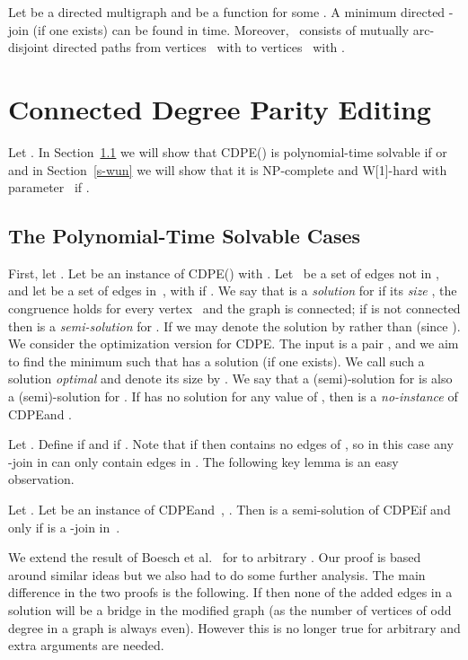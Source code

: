 \documentclass[11pt]{llncs}
\newcommand{\cdpe}{{\sc CDPE}}
\newcommand{\NP}{{\sf NP}}
\newcommand{\W}{{\sf W[1]}}
\begin{document}
\begin{lemma}\label{lem:dir-t-join}
Let  be a directed multigraph and  be  a
function for some .  A minimum directed -join  (if one
exists) can be found in  time. Moreover,~ consists
of mutually arc-disjoint directed paths from vertices~ with  to
vertices~ with .
\end{lemma}




\section{Connected Degree Parity Editing}\label{sec:undirected}

Let .  
In Section~\ref{s-polyun} we will show that
\cdpe() is polynomial-time solvable if  or  and
in Section~\ref{s-wun} we will show 
that it is \NP-complete and \W-hard with parameter~ if .

\subsection{The Polynomial-Time Solvable Cases}\label{s-polyun}
First, let .  Let  be an
instance of \cdpe() with .  Let~ be a set of edges not in ,
and let  be a set of edges in~, with  if .  We
say that  is a {\em solution} for  if its {\em size}
, the congruence  holds for every vertex~ and
the graph  is connected; if  is
not connected then  is a {\em semi-solution} for . If
 we may denote the solution by  rather than  (since
).  We consider the optimization version for \cdpe.  The
input is a pair , and we aim to find the minimum  such that
 has a solution (if one exists).  We call such a solution {\em
optimal} and denote its size by .  We say that a
(semi)-solution for  is also a (semi)-solution for .
If  has no solution for any value of , then  is a
{\em no-instance} of  \cdpe and .

Let .  Define
 if  and  if .  Note that
if  then  contains no edges of , so in this case any
-join in  can only contain edges in . The following
key lemma is an easy observation.

\begin{sloppypar}
\begin{lemma}\label{lem:struct-undir}
Let . Let  be an instance of
\cdpe and~, .  Then
 is a semi-solution of \cdpe if and only if  is a
-join in~.
\end{lemma}
\end{sloppypar}

We extend the result of Boesch et al.~\cite{BoeschST77} for  to arbitrary . Our proof
is based around similar ideas but we also had to do some further analysis. The
main difference in the two proofs is the following. If  then
none of the added edges in a solution will be a bridge in the modified graph
(as the number of vertices of odd degree in a graph is always even). However
this is no longer true for arbitrary  and extra arguments are needed.
\end{document}

